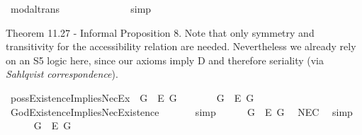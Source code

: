 \begin{isabellebody}
\ modal{\isacharunderscore}trans{\isacharcolon}\ {\isachardoublequoteopen}{\isacharparenleft}{\isasymlfloor}{\isasymphi}\ \isactrlbold {\isasymrightarrow}\ {\isasympsi}{\isasymrfloor}\ {\isasymand}\ {\isasymlfloor}{\isasympsi}\ \isactrlbold {\isasymrightarrow}\ {\isasymchi}{\isasymrfloor}{\isacharparenright}\ {\isasymLongrightarrow}\ {\isasymlfloor}{\isasymphi}\ \isactrlbold {\isasymrightarrow}\ {\isasymchi}{\isasymrfloor}{\isachardoublequoteclose}%
\isadelimproof
\ %
\endisadelimproof
%
\isatagproof
{}\isamarkupfalse%
\ simp%
\endisatagproof
{\isafoldproof}%
%
\isadelimproof
%
\endisadelimproof
%
\begin{isamarkuptext}%
Theorem 11.27 - Informal Proposition 8. Note that only symmetry and transitivity for the accessibility relation are needed.
Nevertheless we already rely on an S5 logic here, since our axioms imply D and therefore seriality (via \emph{Sahlqvist correspondence}).%
\end{isamarkuptext}\isamarkuptrue%
\isamarkupfalse%
\ possExistenceImpliesNecEx{\isacharcolon}\ {\isachardoublequoteopen}{\isasymlfloor}\isactrlbold {\isasymdiamond}\isactrlbold {\isasymexists}\ G\ \isactrlbold {\isasymrightarrow}\ \isactrlbold {\isasymbox}\isactrlbold {\isasymexists}\isactrlsup E\ G{\isasymrfloor}{\isachardoublequoteclose}\ %
\isanewline
%
\isadelimproof
%
\endisadelimproof
%
\isatagproof
{}\isamarkupfalse%
\ {\isacharminus}\isanewline
\ \ \isamarkupfalse%
\ {\isachardoublequoteopen}{\isasymlfloor}\isactrlbold {\isasymexists}\ G\ \isactrlbold {\isasymrightarrow}\ \isactrlbold {\isasymbox}\isactrlbold {\isasymexists}\isactrlsup E\ G{\isasymrfloor}{\isachardoublequoteclose}\ \isamarkupfalse%
\ GodExistenceImpliesNecExistence\ \isanewline
\ \ \ \ \isamarkupfalse%
\ simp\ %
\isanewline
\ \ \isamarkupfalse%
\ {\isachardoublequoteopen}{\isasymlfloor}\isactrlbold {\isasymbox}{\isacharparenleft}\isactrlbold {\isasymexists}\ G\ \isactrlbold {\isasymrightarrow}\ \isactrlbold {\isasymbox}\isactrlbold {\isasymexists}\isactrlsup E\ G{\isacharparenright}{\isasymrfloor}{\isachardoublequoteclose}\ \isamarkupfalse%
\ NEC\ \isamarkupfalse%
\ simp\isanewline
\ \ \isamarkupfalse%
\ {}{\isacharcolon}\ {\isachardoublequoteopen}{\isasymlfloor}\isactrlbold {\isasymdiamond}\isactrlbold {\isasymexists}\ G\ \isactrlbold {\isasymrightarrow}\ \isactrlbold {\isasymdiamond}\isactrlbold {\isasymbox}\isactrlbold {\isasymexists}\isactrlsup E\ G{\isasymrfloor}{\isachardoublequoteclose}\ \isamarkupfalse%

\end{isabellebody}
